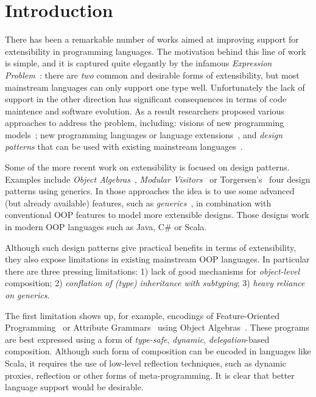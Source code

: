 \section{Introduction}

There has been a remarkable number of works aimed at improving support
for extensibility in programming languages. The motivation behind this
line of work is simple, and it is captured quite elegantly by the
infamous \emph{Expression Problem~}\cite{wadler1998expression}: there
are \emph{two} common and desirable forms of extensibility, but most
mainstream languages can only support one type well. Unfortunately
the lack of support in the other direction has significant
consequences in terms of code maintence and software evolution.  As a
result researchers proposed various approaches to address the problem,
including: visions of new programming
models~\cite{Prehofer97,Tarr99ndegrees,Harrison93subject}; new
programming languages or language
extensions~\cite{McDirmid01Jiazzi,Aracic06CaesarJ,Smaragdakis98mixin,nystrom2006j},
and \emph{design patterns} that can be used with existing mainstream
languages~\cite{togersen:2004,Zenger-Odersky2005,oliveira09modular,oliveira2012extensibility}.

Some of the more recent work on extensibility is focused on design
patterns. Examples include \emph{Object
  Algebras}~\cite{oliveira2012extensibility}, \emph{Modular Visitors}~\cite{oliveira09modular,togersen:2004} or
Torgersen's~\cite{togersen:2004} four design patterns using generics. In those
approaches the idea is to use some advanced (but already available)
features, such as \emph{generics}~\cite{Bracha98making}, in combination with conventional
OOP features to model more extensible designs.  Those designs work in
modern OOP languages such as Java, C\# or Scala.

Although such design patterns give practical benefits in terms of
extensibility, they also expose limitations in existing mainstream OOP
languages. In particular there are three pressing limitations: 
1) lack of good mechanisms for
  \emph{object-level} composition; 2) \emph{conflation of 
    (type) inheritance with subtyping}; 3) \emph{heavy reliance on generics}.

  The first limitation shows up, for example, encodings of Feature-Oriented
  Programming~\cite{Prehofer97} or Attribute Grammars~\cite{Knuth1968} using Object
  Algebras~\cite{oliveira2013feature,rendel14attributes}. These programs are best
  expressed using a form of \emph{type-safe}, \emph{dynamic},
  \emph{delegation}-based composition. Although such form of
  composition can be encoded in languages like Scala, it requires the
  use of low-level reflection techniques, such as dynamic proxies,
  reflection or other forms of meta-programming. It is clear
  that better language support would be desirable.

